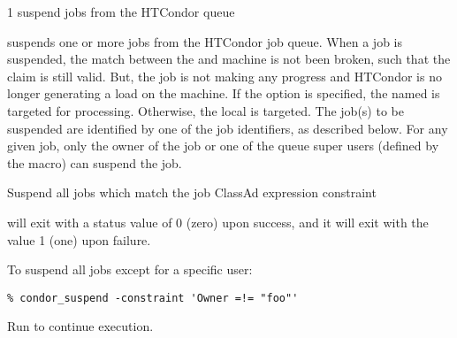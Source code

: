 \begin{ManPage}{\label{man-condor-suspend}}{1}
{suspend jobs from the HTCondor queue}
\Synopsis {}
\ToolArgsBase

\ToolDebugOption
\ToolLocate
{}


\Description

 suspends one or more jobs from the HTCondor job queue.  
When a job is suspended,
the match between the  and machine is not been broken,
such that the claim is still valid.
But, the job is not making any progress and HTCondor is no longer 
generating a load on the machine.
If the  option is specified, the named  is targeted
for processing.  
Otherwise, the local  is targeted.
The job(s) to be suspended are identified by one of the job identifiers, as
described below.
For any given job, only the owner of the job or one of the queue super users
(defined by the  macro) can suspend the job.

\begin{Options}
	\ToolArgsBaseDesc
	\ToolLocateDesc
    \ToolDebugDesc
	 {Suspend all jobs which match
	                the job ClassAd expression constraint}
\end{Options}

\ExitStatus

 will exit with a status value of 0 (zero) upon success,
and it will exit with the value 1 (one) upon failure.

\Examples
To suspend all jobs except for a specific user:
\footnotesize
\begin{verbatim}
% condor_suspend -constraint 'Owner =!= "foo"'
\end{verbatim}
\normalsize

Run  to continue execution.
\end{ManPage}
